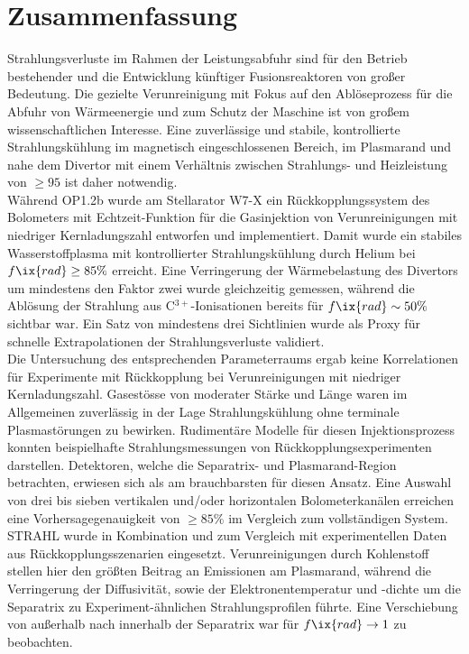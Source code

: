 
\checkoddpage\ifoddpage\clearpage\else\cleardoublepage\fi%

    \chapter*{Zusammenfassung}%

        Strahlungsverluste im Rahmen der Leistungsabfuhr sind für den Betrieb bestehender und die Entwicklung künftiger Fusionsreaktoren von großer Bedeutung. Die gezielte Verunreinigung mit Fokus auf den Ablöseprozess für die Abfuhr von Wärmeenergie und zum Schutz der Maschine ist von großem wissenschaftlichen Interesse. Eine zuverlässige und stabile, kontrollierte Strahlungskühlung im magnetisch eingeschlossenen Bereich, im Plasmarand und nahe dem Divertor mit einem Verhältnis zwischen Strahlungs- und Heizleistung von $\ge95$ ist daher notwendig.\\%
        Während OP1.2b wurde am Stellarator W7-X ein Rückkopplungssystem des Bolometers mit Echtzeit-Funktion für die Gasinjektion von Verunreinigungen mit niedriger Kernladungszahl entworfen und implementiert. Damit wurde ein stabiles Wasserstoffplasma mit kontrollierter Strahlungskühlung durch Helium bei $f\ix{rad}\ge85\%$ erreicht. Eine Verringerung der Wärmebelastung des Divertors um mindestens den Faktor zwei wurde gleichzeitig gemessen, während die Ablösung der Strahlung aus C$^{3+}$-Ionisationen bereits für $f\ix{rad}\sim50\%$ sichtbar war. Ein Satz von mindestens drei Sichtlinien wurde als Proxy für schnelle Extrapolationen der Strahlungsverluste validiert.\\%
        Die Untersuchung des entsprechenden Parameterraums ergab keine Korrelationen für Experimente mit Rückkopplung bei Verunreinigungen mit niedriger Kernladungszahl. Gasestösse von moderater Stärke und Länge waren im Allgemeinen zuverlässig in der Lage Strahlungskühlung ohne terminale Plasmastörungen zu bewirken. Rudimentäre Modelle für diesen Injektionsprozess konnten beispielhafte Strahlungsmessungen von Rückkopplungsexperimenten darstellen. Detektoren, welche die Separatrix- und Plasmarand-Region betrachten, erwiesen sich als am brauchbarsten für diesen Ansatz. Eine Auswahl von drei bis sieben vertikalen und/oder horizontalen Bolometerkanälen erreichen eine Vorhersagegenauigkeit von $\ge85\%$ im Vergleich zum vollständigen System. STRAHL wurde in Kombination und zum Vergleich mit experimentellen Daten aus Rückkopplungsszenarien eingesetzt. Verunreinigungen durch Kohlenstoff stellen hier den größten Beitrag an Emissionen am Plasmarand, während die Verringerung der Diffusivität, sowie der Elektronentemperatur und -dichte um die Separatrix zu Experiment-ähnlichen Strahlungsprofilen führte. Eine Verschiebung von außerhalb nach innerhalb der Separatrix war für $f\ix{rad}\rightarrow1$ zu beobachten.\\%
